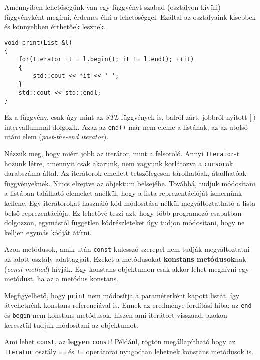 \documentclass[../cpp_book/cpp_book.tex]{subfiles}
\begin{document}
 	Amennyiben lehetőségünk van egy függvényt szabad (osztályon kívüli) függvényként megírni, érdemes élni a lehetőséggel. Ezáltal az osztályaink kisebbek és könnyebben érthetőek lesznek.
	\begin{lstlisting}
void print(List &l)
{
	for(Iterator it = l.begin(); it != l.end(); ++it)
	{
		std::cout << *it << ' ';
	}
	std::cout << std::endl;
}
	\end{lstlisting}
	Ez a függvény, csak úgy mint az \textit{STL} függvények is, balról zárt, jobbról nyitott $[\ )$ intervallummal dolgozik. Azaz az \texttt{end()} már nem eleme a listának, az az utolsó {utáni} elem (\textit{past-the-end iterator}).
	
	\medskip
	Nézzük meg, hogy miért jobb az iterátor, mint a felsoroló. Annyi \texttt{Iterator}-t hozunk létre, amennyit csak akarunk, nem vagyunk korlátozva a \texttt{cursor}ok darabszáma által. Az iterátorok emellett tetszőlegesen tárolhatóak, átadhatóak függvényeknek. Nincs elrejtve az objektum belsejébe. Továbbá, tudjuk módosítani a listában található elemeket anélkül, hogy a lista reprezentációját ismernünk kellene. Egy iterátorokat használó kód módosítása nélkül megváltoztatható a lista belső reprezentációja. Ez lehetővé teszi azt, hogy több programozó csapatban dolgozzon, egymástól független kódrészleteket úgy tudjon módosítani, hogy ne kelljen egymás kódját átírni.
	
	\medskip
	Azon metódusok, amik után \texttt{const} kulcsszó szerepel nem tudják megváltoztatni az adott osztály adattagjait. Ezeket a metódusokat \textbf{konstans metódusok}nak (\textit{const method}) hívják. Egy konstans objektumon csak akkor lehet meghívni egy metódust, ha az a metódus konstans.
	
	\medskip
	Megfigyelhető, hogy \texttt{print} nem módosítja a paraméterként kapott listát, így átvehetnénk konstans referenciával is. Ennek az eredménye fordítási hiba: az \texttt{end} és \texttt{begin} nem konstans metódusok, hiszen ami iterátort visszaad, azokon keresztül tudjuk módosítani az objektumot.
	\begin{note}
		Ami lehet \texttt{const}, az \textbf{legyen} \texttt{const}! Például, rögtön megállapítható hogy az \texttt{Iterator} osztály \texttt{==} és \texttt{!=} operátorai nyugodtan lehetnek konstans metódusok is.
	\end{note}
\end{document}
